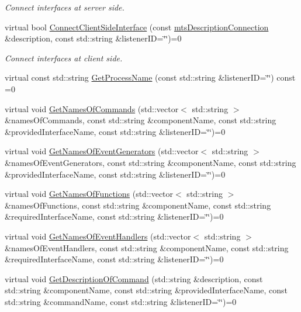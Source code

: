 \begin{DoxyCompactItemize}
\begin{DoxyCompactList}\small\item\em Connect interfaces at server side. \end{DoxyCompactList}\item 
virtual bool \hyperlink{classmts_manager_local_interface_ac89f1ce8ca7e003b085b56aa25a72117}{Connect\-Client\-Side\-Interface} (const \hyperlink{classmts_description_connection}{mts\-Description\-Connection} \&description, const std\-::string \&listener\-I\-D=\char`\"{}\char`\"{})=0
\begin{DoxyCompactList}\small\item\em Connect interfaces at client side. \end{DoxyCompactList}\item 
virtual const std\-::string \hyperlink{classmts_manager_local_interface_af0a457e2895c8e4fc74aebdfce72d7c8}{Get\-Process\-Name} (const std\-::string \&listener\-I\-D=\char`\"{}\char`\"{}) const =0
\item 
virtual void \hyperlink{classmts_manager_local_interface_aab7e0d3a40ec1648db29ac89c4637e8c}{Get\-Names\-Of\-Commands} (std\-::vector$<$ std\-::string $>$ \&names\-Of\-Commands, const std\-::string \&component\-Name, const std\-::string \&provided\-Interface\-Name, const std\-::string \&listener\-I\-D=\char`\"{}\char`\"{})=0
\item 
virtual void \hyperlink{classmts_manager_local_interface_ad38b0648dfc2b65a8e52329c177d60c5}{Get\-Names\-Of\-Event\-Generators} (std\-::vector$<$ std\-::string $>$ \&names\-Of\-Event\-Generators, const std\-::string \&component\-Name, const std\-::string \&provided\-Interface\-Name, const std\-::string \&listener\-I\-D=\char`\"{}\char`\"{})=0
\item 
virtual void \hyperlink{classmts_manager_local_interface_a3173ffcf8034e0349e09a11704a5e488}{Get\-Names\-Of\-Functions} (std\-::vector$<$ std\-::string $>$ \&names\-Of\-Functions, const std\-::string \&component\-Name, const std\-::string \&required\-Interface\-Name, const std\-::string \&listener\-I\-D=\char`\"{}\char`\"{})=0
\item 
virtual void \hyperlink{classmts_manager_local_interface_a6039080ae305d1088608aa8ab3268d3e}{Get\-Names\-Of\-Event\-Handlers} (std\-::vector$<$ std\-::string $>$ \&names\-Of\-Event\-Handlers, const std\-::string \&component\-Name, const std\-::string \&required\-Interface\-Name, const std\-::string \&listener\-I\-D=\char`\"{}\char`\"{})=0
\item 
virtual void \hyperlink{classmts_manager_local_interface_a2d8b5e7595a9e33111ed927b363f22fd}{Get\-Description\-Of\-Command} (std\-::string \&description, const std\-::string \&component\-Name, const std\-::string \&provided\-Interface\-Name, const std\-::string \&command\-Name, const std\-::string \&listener\-I\-D=\char`\"{}\char`\"{})=0

\end{DoxyCompactItemize}
